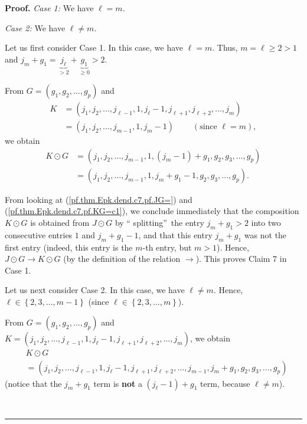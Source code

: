 \documentclass[numbers=enddot,12pt,final,onecolumn,notitlepage]{scrartcl}%
\theoremstyle{definition}
\newenvironment{proof}[1][Proof]{\noindent\textbf{#1.} }{\ \rule{0.5em}{0.5em}}
\newenvironment{verlong}{}{}
\begin{document}
\begin{verlong}
\begin{proof}
\textit{Case 1:} We have $\ell=m$.

\textit{Case 2:} We have $\ell\neq m$.

Let us first consider Case 1. In this case, we have $\ell=m$. Thus,
$m=\ell\geq2>1$ and $j_{m}+g_{1}=\underbrace{j_{\ell}}_{>2}+\underbrace{g_{1}%
}_{\geq0}>2$.

From $G=\left(  g_{1},g_{2},\ldots,g_{p}\right)  $ and
\begin{align*}
K  &  =\left(  j_{1},j_{2},\ldots,j_{\ell-1},1,j_{\ell}-1,j_{\ell+1}%
,j_{\ell+2},\ldots,j_{m}\right) \\
&  =\left(  j_{1},j_{2},\ldots,j_{m-1},1,j_{m}-1\right)
\ \ \ \ \ \ \ \ \ \ \left(  \text{since }\ell=m\right)  ,
\end{align*}
we obtain%
\begin{align}
K\odot G  &  =\left(  j_{1},j_{2},\ldots,j_{m-1},1,\left(  j_{m}-1\right)
+g_{1},g_{2},g_{3},\ldots,g_{p}\right) \nonumber\\
&  =\left(  j_{1},j_{2},\ldots,j_{m-1},1,j_{m}+g_{1}-1,g_{2},g_{3}%
,\ldots,g_{p}\right)  . \label{pf.thm.Epk.dend.c7.pf.KG=c1}%
\end{align}


From looking at (\ref{pf.thm.Epk.dend.c7.pf.JG=}) and
(\ref{pf.thm.Epk.dend.c7.pf.KG=c1}), we conclude immediately that the
composition $K\odot G$ is obtained from $J\odot G$ by \textquotedblleft
splitting\textquotedblright\ the entry $j_{m}+g_{1}>2$ into two consecutive
entries $1$ and $j_{m}+g_{1}-1$, and that this entry $j_{m}+g_{1}$ was not the
first entry (indeed, this entry is the $m$-th entry, but $m>1$). Hence,
$J\odot G\rightarrow K\odot G$ (by the definition of the relation
$\rightarrow$). This proves Claim 7 in Case 1.

Let us next consider Case 2. In this case, we have $\ell\neq m$. Hence,
$\ell\in\left\{  2,3,\ldots,m-1\right\}  $ (since $\ell\in\left\{
2,3,\ldots,m\right\}  $).

From $G=\left(  g_{1},g_{2},\ldots,g_{p}\right)  $ and $K=\left(  j_{1}%
,j_{2},\ldots,j_{\ell-1},1,j_{\ell}-1,j_{\ell+1},j_{\ell+2},\ldots
,j_{m}\right)  $, we obtain%
\begin{align}
&  K\odot G\nonumber\\
&  =\left(  j_{1},j_{2},\ldots,j_{\ell-1},1,j_{\ell}-1,j_{\ell+1},j_{\ell
+2},\ldots,j_{m-1},j_{m}+g_{1},g_{2},g_{3},\ldots,g_{p}\right)
\label{pf.thm.Epk.dend.c7.pf.KG=c2}%
\end{align}
(notice that the $j_{m}+g_{1}$ term is \textbf{not} a $\left(  j_{\ell
}-1\right)  +g_{1}$ term, because $\ell\neq m$).


\end{proof}
\end{verlong}
\end{document}
